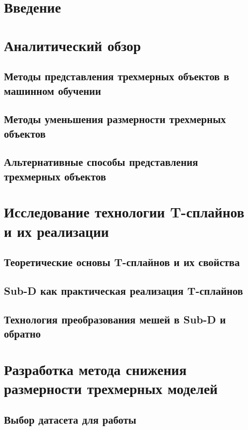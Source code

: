 \documentclass[a4paper,14pt]{extarticle}
\begin{document}
\tableofcontents
\newpage

\section*{Введение}


\section{Аналитический обзор}
\subsection{Методы представления трехмерных объектов в машинном обучении}
\subsection{Методы уменьшения размерности трехмерных объектов}
\subsection{Альтернативные способы представления трехмерных объектов}

\section{Исследование технологии T-сплайнов и их реализации}
\subsection{Теоретические основы T-сплайнов и их свойства}
\subsection{Sub-D как практическая реализация T-сплайнов}
\subsection{Технология преобразования мешей в Sub-D и обратно}

\section{Разработка метода снижения размерности трехмерных моделей}
\subsection{Выбор датасета для работы}
\end{document}
